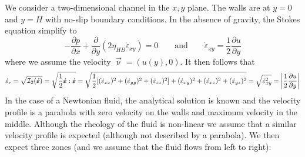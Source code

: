 We consider a two-dimensional channel in the $x,y$ plane. The walls 
are at $y=0$ and $y=H$ with no-slip boundary conditions. 
In the absence of gravity, the Stokes equation simplify to 
\begin{equation}
-\frac{\partial p}{\partial x}  +\frac{\partial }{\partial y} (2\eta_{HB} \dot{\varepsilon}_{xy}) =0
\qquad
\text{and}
\qquad
\dot{\varepsilon}_{xy} = \frac{1}{2} \frac{\partial u}{\partial y} 
\label{eq:hb1}
\end{equation}
where we assume the velocity $\vec\upnu=(u(y),0)$.
It then follows that 
\[
\dot{\varepsilon}_{e} 
= \sqrt{{\cal I}_2(\dot{\bm \varepsilon})} 
=\sqrt{ \frac{1}{2} \dot{\bm \varepsilon} : \dot{\bm \varepsilon} }
=\sqrt{ 
\frac{1}{2}[(\dot{\varepsilon}_{xx})^2 + (\dot{\varepsilon}_{yy})^2 + (\dot{\varepsilon}_{zz})^2]  
+ (\dot{\varepsilon}_{xy})^2  
+ (\dot{\varepsilon}_{xz})^2  
+ (\dot{\varepsilon}_{yz})^2 
}
=\sqrt{\dot{\varepsilon}_{xy}^2 }
= \left|\frac{1}{2} \frac{\partial u}{\partial y}  \right|
\]
In the case of a Newtonian fluid, the analytical solution is 
known and the velocity profile is a parabola with zero velocity on the
walls and maximum velocity in the middle. 
Although the rheology of the fluid is non-linear we assume that a 
similar velocity profile is expected (although not described by a parabola).
We then expect three zones (and we assume that the fluid flows from left to right):
